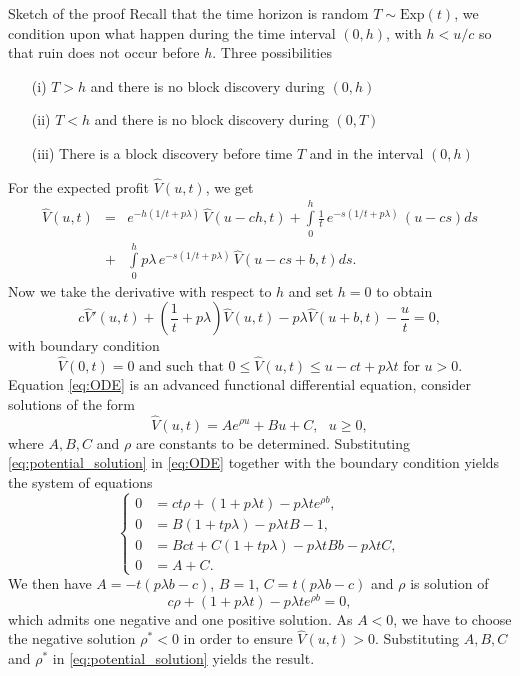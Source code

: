 \documentclass{beamer}
\begin{document}
\begin{frame}[allowframebreaks]{Sketch of the proof}
\scriptsize
Recall that the time horizon is random $T\sim\text{Exp}(t)$, we condition upon what happen during the time interval $(0,h)$, with $h<u/c$ so that ruin does not occur before $h$. Three possibilities
\begin{itemize}
  \item[(i)] $T>h$ and there is no block discovery during $(0,h)$
  \item[(ii)] $T<h$ and there is no block discovery during $(0,T)$
  \item[(iii)] There is a block discovery before time $T$ and in the interval $(0,h)$
\end{itemize}
For the expected profit $\widehat{V}(u,t)$, we get 
\begin{eqnarray*}
  \widehat{V}(u,t)& =&e^{-h(1/t + p\lambda)}\,\widehat{V}(u-ch,t)+\int\limits_0^h\frac1t\, e^{-s(1/t + p\lambda)}\,(u-cs)ds\\
  &+&\int\limits_0^h p\lambda\, e^{-s(1/t + p\lambda)}\,\widehat{V}(u-cs+b,t)ds.
  \end{eqnarray*}
Now we take the derivative with respect to $h$ and set $h=0$ to obtain
\begin{equation}\label{eq:ODE}
c\widehat{V}'(u,t) + \left(\frac{1}{t} +  p\lambda\right)\widehat{V}(u,t) - p\lambda \widehat{V}(u+b,t) - \frac{u}{t} =0,
\end{equation}
with boundary condition 
$$\widehat{V}(0,t) = 0 \text{ and such that } 0\leq \widehat{V}(u,t)\leq u-ct+p\lambda t \text{ for }u>0.
$$  
Equation \eqref{eq:ODE} is an advanced functional differential equation, consider solutions of the form 
\begin{equation}\label{eq:potential_solution}
\widehat{V}(u,t) = Ae^{\rho u }+Bu + C,\text{ }u \ge 0, 
\end{equation}
where $A, B,C$ and $\rho$ are constants to be determined. Substituting \eqref{eq:potential_solution} in \eqref{eq:ODE} together with the boundary condition yields the system of equations 
\begin{equation*}
\begin{cases}
0&=ct\rho + \left(1+p\lambda t\right)-p\lambda te^{\rho b}, \\
0&= B\left(1+tp\lambda\right)-p\lambda tB - 1,\\
0&=Bct+C(1+tp\lambda) - p\lambda t Bb-p\lambda tC, \\
0&=A+C.
\end{cases}
\end{equation*}
We then have $A = -t(p\lambda b - c)$, $B = 1$, $C = t(p\lambda b - c)$ and $\rho$ is solution of 
$$
c\rho + \left(1+p\lambda t\right)-p\lambda te^{\rho b} = 0,
$$
which admits one negative and one positive solution. As $A<0$, we have to choose the negative solution $\rho^\ast<0$ in order to ensure $\widehat{V}(u,t)>0$. Substituting $A,B,C$ and $\rho^{\ast}$ in \eqref{eq:potential_solution}  yields the result.\\


\end{frame}
\end{document}
